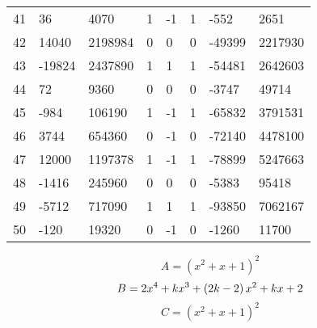 \documentclass{amsart}
\begin{document}
\begin{longtable}{|l|l|l|lllll|}
41&36&4070&1&-1&1&-552&2651\\
42&14040&2198984&0&0&0&-49399&2217930\\
43&-19824&2437890&1&1&1&-54481&2642603\\
44&72&9360&0&0&0&-3747&49714\\
45&-984&106190&1&-1&1&-65832&3791531\\
46&3744&654360&0&-1&0&-72140&4478100\\
47&12000&1197378&1&-1&1&-78899&5247663\\
48&-1416&245960&0&0&0&-5383&95418\\
49&-5712&717090&1&1&1&-93850&7062167\\
50&-120&19320&0&-1&0&-1260&11700\\
\hline
\end{longtable}
$$A=(x^2
 + x
 + 1)^{2}$$
$$B=2\*x^4
 + k\*x^3
 + \left(2\*k
 - 2\right) \*x^2
 + k\*x
 + 2$$
$$C=(x^2
 + x
 + 1)^{2}$$
\end{document}
